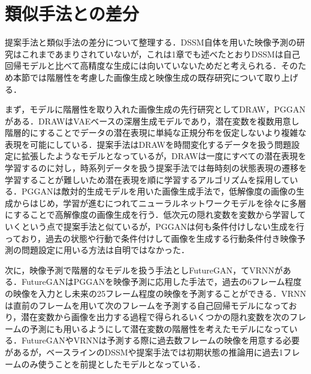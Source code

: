 \section{類似手法との差分}
提案手法と類似手法の差分について整理する．DSSM自体を用いた映像予測の研究はこれまであまりされていないが，これは1章でも述べたとおりDSSMは自己回帰モデルと比べて高精度な生成には向いていないためだと考えられる．そのため本節では階層性を考慮した画像生成と映像生成の既存研究について取り上げる．

まず，モデルに階層性を取り入れた画像生成の先行研究としてDRAW\cite{gregor2015draw}，PGGAN\cite{karras2017progressive}がある．DRAWはVAEベースの深層生成モデルであり，潜在変数を複数用意し階層的にすることでデータの潜在表現に単純な正規分布を仮定しないより複雑な表現を可能にしている．提案手法はDRAWを時間変化するデータを扱う問題設定に拡張したようなモデルとなっているが，DRAWは一度にすべての潜在表現を学習するのに対し，時系列データを扱う提案手法では毎時刻の状態表現の遷移を学習することが難しいため潜在表現を順に学習するアルゴリズムを採用している．PGGANは敵対的生成モデルを用いた画像生成手法で，低解像度の画像の生成からはじめ，学習が進むにつれてニューラルネットワークモデルを徐々に多層にすることで高解像度の画像生成を行う．低次元の隠れ変数を変数から学習していくという点で提案手法と似ているが，PGGANは何も条件付けしない生成を行っており，過去の状態や行動で条件付けして画像を生成する行動条件付き映像予測の問題設定に用いる方法は自明ではなかった．

次に，映像予測で階層的なモデルを扱う手法としFutureGAN\cite{Aigner_2019}，てVRNN\cite{castrejon2019improved}がある．FutureGANはPGGANを映像予測に応用した手法で，過去の6フレーム程度の映像を入力とし未来の25フレーム程度の映像を予測することができる．VRNNは直前のフレームを用いて次のフレームを予測する自己回帰モデルになっており，潜在変数から画像を出力する過程で得られるいくつかの隠れ変数を次のフレームの予測にも用いるようにして潜在変数の階層性を考えたモデルになっている．FutureGANやVRNNは予測する際に過去数フレームの映像を用意する必要があるが，ベースラインのDSSMや提案手法では初期状態の推論用に過去1フレームのみ使うことを前提としたモデルとなっている．



